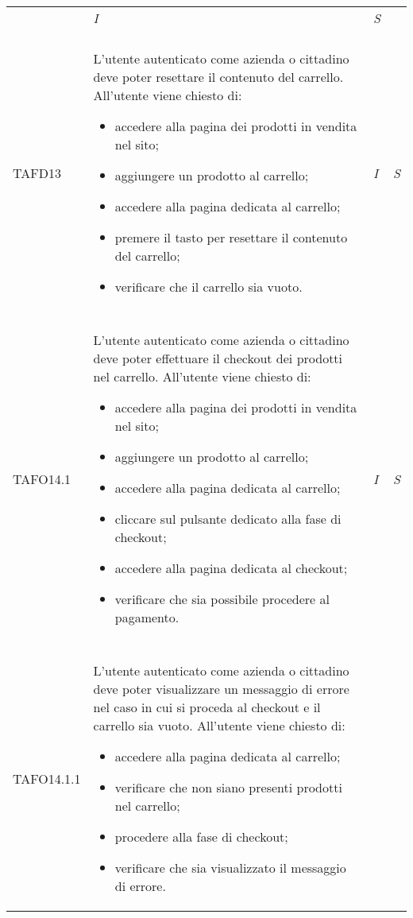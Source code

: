\begin{longtable}{ >{\centering}p{} >{}p{}
			>{\centering}p{} >{\centering}p{}}
\begin{itemize}
		 \end{itemize} & \textit{I} & \textit{S}\\ \tabularnewline
\hypertarget{TAFD13}{TAFD13} & L'utente autenticato come azienda o cittadino deve poter resettare il
		 contenuto del carrello. All'utente viene chiesto di:
		 \begin{itemize}
		 	\item accedere alla pagina dei prodotti in vendita nel sito;
		 	\item aggiungere un prodotto al carrello;
		 	\item accedere alla pagina dedicata al carrello;
		 	\item premere il tasto per resettare il contenuto del carrello;
		 	\item verificare che il carrello sia vuoto.
		 \end{itemize} & \textit{I} & \textit{S}\\ \tabularnewline
\hypertarget{TAFO14.1}{TAFO14.1} & L'utente autenticato come azienda o cittadino deve poter effettuare il
		 checkout dei prodotti nel carrello. All'utente viene chiesto di:
		 \begin{itemize}
		 	\item accedere alla pagina dei prodotti in vendita nel sito;
		 	\item aggiungere un prodotto al carrello;
		 	\item accedere alla pagina dedicata al carrello;
		 	\item cliccare sul pulsante dedicato alla fase di checkout;
		 	\item accedere alla pagina dedicata al checkout;
		 	\item verificare che sia possibile procedere al pagamento.
		 \end{itemize} & \textit{I} & \textit{S}\\ \tabularnewline
\hypertarget{TAFO14.1.1}{TAFO14.1.1} & L'utente autenticato come azienda o cittadino deve poter visualizzare un
		 messaggio di errore nel caso in cui si proceda al checkout e il carrello sia
		 vuoto. All'utente viene chiesto di:
		 \begin{itemize}
		 	\item accedere alla pagina dedicata al carrello;
		 	\item verificare che non siano presenti prodotti nel carrello;
		 	\item procedere alla fase di checkout;
		 	\item verificare che sia visualizzato il messaggio di errore.

\end{itemize}
\end{longtable}
